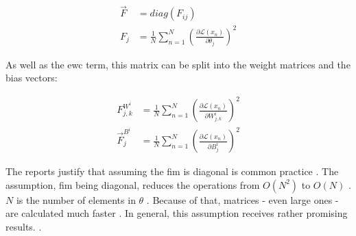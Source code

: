 \begin{equation}
    \begin{split}
        \vec{F} & = diag \left( F_{ij} \right)
        \\
        F_{j} & = 
        \frac{1}{N} 
        \sum_{n=1}^{N} 
        \left(
            \frac{\partial \mathcal{L} \left( x_n \right) }{\partial \theta_{j}}
        \right)^2
    \end{split}
    \label{eq:ewc_diagonal_fisher}
\end{equation}

As well as the \acrshort{ewc} term, this matrix can be split into the weight matrices and the bias vectors:

\begin{equation}
    \begin{split}
        F^{W^i}_{j,k} & = 
        \frac{1}{N} 
        \sum_{n=1}^{N} 
        \left(
            \frac{\partial \mathcal{L} \left( x_n \right) }{\partial W^i_{j,k}}
        \right)^2
        \\
        \vec{F}^{B^i}_j & = 
        \frac{1}{N} 
        \sum_{n=1}^{N} 
        \left(
            \frac{\partial \mathcal{L} \left( x_n \right) }{\partial B^i_{j}}
        \right)^2
    \end{split}
\end{equation}

The reports \cite{better-weight-consolidation,elastic-weight-consolidation} justify that assuming the \acrshort{fim} is diagonal is common practice \cite{elastic-weight-consolidation,better-weight-consolidation,incremental-moment-matching}.
The assumption, \acrshort{fim} being diagonal, reduces the operations from $O(N^2)$ to $O(N)$ \cite{elastic-weight-consolidation,better-weight-consolidation}.
$N$ is the number of elements in $\theta$ \cite{elastic-weight-consolidation,better-weight-consolidation}.
Because of that, matrices - even large ones - are calculated much faster \cite{elastic-weight-consolidation,better-weight-consolidation}.
In general, this assumption receives rather promising results. %
\cite{elastic-weight-consolidation,incremental-moment-matching}.

